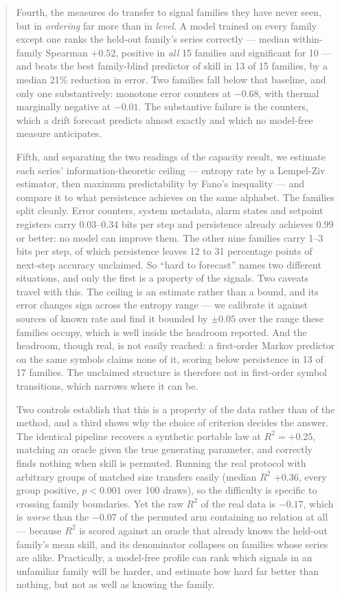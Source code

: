 \documentclass[11pt,a4paper]{article}
\newcommand{\num}[1]{#1}
\begin{document}
\begin{abstract}
Fourth, the measures do transfer to signal families they have never seen, but
in \emph{ordering} far more than in \emph{level}. A model trained on every
family except one ranks the held-out family's series correctly --- median
within-family Spearman \(+0.52\), positive in \emph{all} \num{15} families and
significant for \num{10} --- and beats the best family-blind
predictor of skill in \num{13} of \num{15} families, by a median \num{21}\%
reduction in error. Two families fall below that baseline, and only one
substantively: monotone error counters at \(-0.68\), with thermal marginally
negative at \(-0.01\). The substantive failure is the counters, which a drift
forecast predicts almost exactly and which no model-free measure anticipates.

Fifth, and separating the two readings of the capacity result, we estimate each
series' information-theoretic ceiling --- entropy rate by a Lempel-Ziv
estimator, then maximum predictability by Fano's inequality --- and compare it
to what persistence achieves on the same alphabet. The families split cleanly.
Error counters, system metadata, alarm states and setpoint registers carry
\num{0.03}--\num{0.34} bits per step and persistence already achieves \num{0.99}
or better: no model can improve them. The other nine families carry
\num{1}--\num{3} bits per step, of which persistence leaves \num{12} to \num{31}
percentage points of next-step accuracy unclaimed. So ``hard to forecast'' names
two different situations, and only the first is a property of the signals.
Two caveats travel with this. The ceiling is an estimate rather than a bound,
and its error changes sign across the entropy range --- we calibrate it against
sources of known rate and find it bounded by \(\pm\num{0.05}\) over the range
these families occupy, which is well inside the headroom reported. And the
headroom, though real, is not easily reached: a first-order Markov predictor on
the same symbols claims none of it, scoring below persistence in \num{13} of
\num{17} families. The unclaimed structure is therefore not in first-order
symbol transitions, which narrows where it can be.

Two controls establish that this is a property of the data rather than of the
method, and a third shows why the choice of criterion decides the answer. The
identical pipeline recovers a synthetic portable law at \(R^2=+0.25\), matching
an oracle given the true generating parameter, and correctly finds nothing when
skill is permuted. Running the real protocol with arbitrary groups of matched
size transfers easily (median \(R^2\) \(+0.36\), every group positive,
\(p<0.001\) over \num{100} draws), so the difficulty is specific to crossing
family boundaries. Yet the raw \(R^2\) of the real data is \(-0.17\), which is
\emph{worse} than the \(-0.07\) of the permuted arm containing no relation at
all --- because \(R^2\) is scored against an oracle that already knows the
held-out family's mean skill, and its denominator collapses on families whose
series are alike. Practically, a model-free profile can rank which signals in an
unfamiliar family will be harder, and estimate how hard far better than nothing,
but not as well as knowing the family.
\end{abstract}
\end{document}
